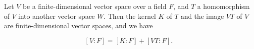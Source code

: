 Let $V$ be a finite-dimensional vector space over a field $F$, and $T$ a homomorphism of $V$ into another vector space $W$. Then the kernel $K$ of $T$ and the image $VT$ of $V$ are finite-dimensional vector spaces, and we have

$$[V:F] = [K:F] + [VT:F].$$
